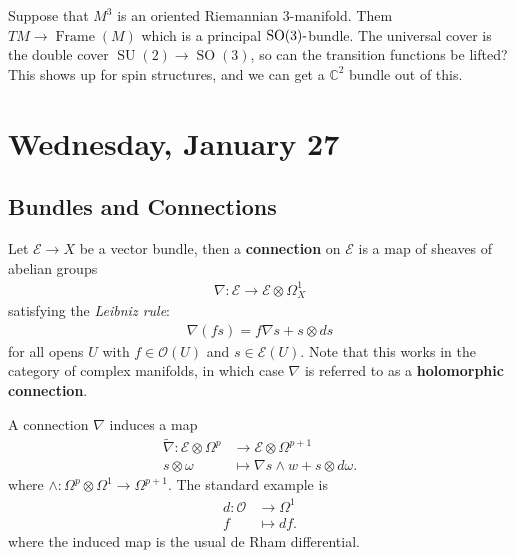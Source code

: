 \begin{remark}

Suppose that \(M^3\) is an oriented Riemannian 3-manifold. Them
\(TM\to {\operatorname{Frame}}(M)\) which is a principal
\({\operatorname{SO}}(3){\hbox{-}}\)bundle. The universal cover is the
double cover \({\operatorname{SU}}(2) \to {\operatorname{SO}}(3)\), so
can the transition functions be lifted? This shows up for spin
structures, and we can get a \({\mathbb{C}}^2\) bundle out of this.

\end{remark}

\hypertarget{wednesday-january-27}{%
\section{Wednesday, January 27}\label{wednesday-january-27}}

\hypertarget{bundles-and-connections}{%
\subsection{Bundles and Connections}\label{bundles-and-connections}}

\begin{definition}[Connections]

Let \(\mathcal{E}\to X\) be a vector bundle, then a \textbf{connection}
on \(\mathcal{E}\) is a map of sheaves of abelian groups
\begin{align*}
\nabla: \mathcal{E}\to \mathcal{E}\otimes\Omega^1_X  
\end{align*}
satisfying the \emph{Leibniz rule}:
\begin{align*} 
\nabla (fs) = f \nabla s + s\otimes ds 
\end{align*}
for all opens \(U\) with \(f\in {\mathcal{O}}(U)\) and
\(s\in \mathcal{E}(U)\). Note that this works in the category of complex
manifolds, in which case \(\nabla\) is referred to as a
\textbf{holomorphic connection}.

\end{definition}

\begin{remark}

A connection \(\nabla\) induces a map
\begin{align*}
\tilde{\nabla}: \mathcal{E}\otimes\Omega^p &\to \mathcal{E}\otimes\Omega^{p+1} \\
s \otimes \omega &\mapsto \nabla s \wedge w + s\otimes d \omega
.\end{align*}
where \(\wedge: \Omega^p \otimes\Omega^1 \to \Omega^{p+1}\). The
standard example is
\begin{align*}
d: {\mathcal{O}}&\to \Omega^1 \\
f &\mapsto df
.\end{align*}
where the induced map is the usual de Rham differential.

\end{remark}

